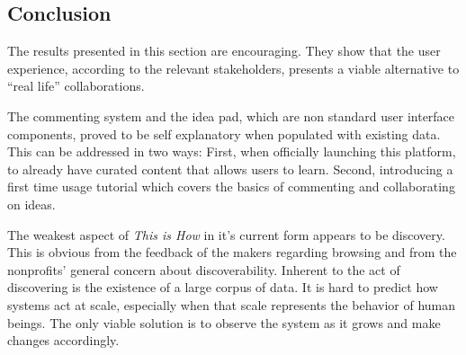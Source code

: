 \subsection{Conclusion}

The results presented in this section are encouraging. They show that the user experience, according to the relevant stakeholders, presents a viable alternative to ``real life'' collaborations.

The commenting system and the idea pad, which are non standard user interface components, proved to be self explanatory when populated with existing data. This can be addressed in two ways: First, when officially launching this platform, to already have curated content that allows users to learn. Second, introducing a first time usage tutorial which covers the basics of commenting and collaborating on ideas.

The weakest aspect of \textit{This is How} in it's current form appears to be discovery. This is obvious from the feedback of the makers regarding browsing and from the nonprofits' general concern about discoverability. Inherent to the act of discovering is the existence of a large corpus of data. It is hard to predict how systems act at scale, especially when that scale represents the behavior of human beings. The only viable solution is to observe the system as it grows and make changes accordingly.